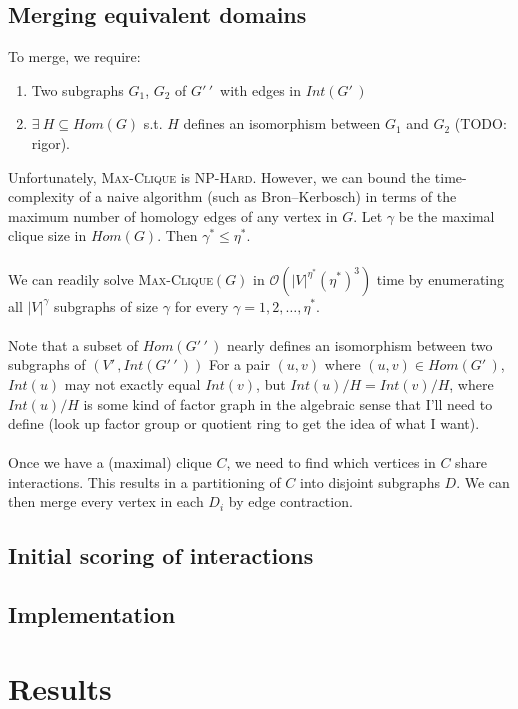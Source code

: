 \documentclass[12pt,twoside]{article}
\begin{document}
\subsection{Merging equivalent domains}

To merge, we require:
\begin{enumerate}
\item Two subgraphs $G_1$, $G_2$ of $G'\,\!'\,\!$ with edges in $Int(G'\,\!)$
\item $\exists \: H \subseteq Hom(G)$ s.t. $H$ defines an isomorphism between $G_1$ and $G_2$ (TODO: rigor).
\end{enumerate}
Unfortunately, \textsc{Max-Clique} is \textsc{NP-Hard}. However, we can bound the time-complexity of a naive algorithm (such as Bron--Kerbosch) in terms of the maximum number of homology edges of any vertex in $G$. Let $\gamma$ be the maximal clique size in $Hom(G)$. Then $\gamma^* \leq \eta^*$.\\\\
We can readily solve \textsc{Max-Clique}$(G)$ in $\mathcal O(|V|^{\eta^*}(\eta^*)^3)$ time by enumerating all $|V|^{\gamma}$ subgraphs of size $\gamma$ for every $\gamma = 1, 2, \ldots, \eta^*$.\\\\
Note that a subset of $Hom(G'\,\!'\,\!)$ nearly defines an isomorphism between two subgraphs of $(V'\,\!, Int(G'\,\!'\,\!))$ For a pair $(u,v)$ where $(u,v) \in Hom(G'\,\!)$, $Int(u)$ may not exactly equal $Int(v)$, but $Int(u) / H = Int(v) / H$, where $Int(u) / H$ is some kind of factor graph in the algebraic sense that I'll need to define (look up factor group or quotient ring to get the idea of what I want).\\\\
Once we have a (maximal) clique $C$, we need to find which vertices in $C$ share interactions. This results in a partitioning of $C$ into disjoint subgraphs $D$. We can then merge every vertex in each $D_i$ by edge contraction.

\subsection{Initial scoring of interactions}

\subsection{Implementation}

\section{Results}
\end{document}
